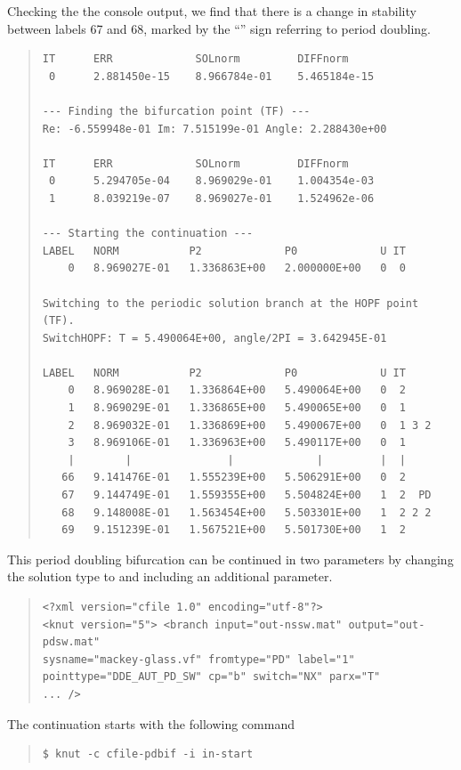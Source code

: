 \documentclass[10pt,a4paper]{ddedoc}
\begin{document}
Checking the the console output, we find that there is a change in
stability between labels 67 and 68, marked by the ``'' sign referring
to period doubling.
{ \small \begin{quote} \begin{lstlisting}[basicstyle=\tt,frame=single]
IT      ERR             SOLnorm         DIFFnorm
 0      2.881450e-15    8.966784e-01    5.465184e-15

--- Finding the bifurcation point (TF) ---
Re: -6.559948e-01 Im: 7.515199e-01 Angle: 2.288430e+00

IT      ERR             SOLnorm         DIFFnorm
 0      5.294705e-04    8.969029e-01    1.004354e-03
 1      8.039219e-07    8.969027e-01    1.524962e-06

--- Starting the continuation ---
LABEL   NORM           P2             P0             U IT
    0   8.969027E-01   1.336863E+00   2.000000E+00   0  0

Switching to the periodic solution branch at the HOPF point (TF).
SwitchHOPF: T = 5.490064E+00, angle/2PI = 3.642945E-01

LABEL   NORM           P2             P0             U IT
    0   8.969028E-01   1.336864E+00   5.490064E+00   0  2
    1   8.969029E-01   1.336865E+00   5.490065E+00   0  1
    2   8.969032E-01   1.336869E+00   5.490067E+00   0  1 3 2
    3   8.969106E-01   1.336963E+00   5.490117E+00   0  1
    |        |               |             |         |  |
   66   9.141476E-01   1.555239E+00   5.506291E+00   0  2
   67   9.144749E-01   1.559355E+00   5.504824E+00   1  2  PD
   68   9.148008E-01   1.563454E+00   5.503301E+00   1  2 2 2
   69   9.151239E-01   1.567521E+00   5.501730E+00   1  2
\end{lstlisting} \end{quote} } \noindent
This period doubling bifurcation can be continued in two parameters 
by changing the solution type to  and including an additional
parameter.
{ \small \begin{quote} \begin{lstlisting}[basicstyle=\tt,frame=single]
<?xml version="cfile 1.0" encoding="utf-8"?>
<knut version="5"> <branch input="out-nssw.mat" output="out-pdsw.mat"
sysname="mackey-glass.vf" fromtype="PD" label="1"
pointtype="DDE_AUT_PD_SW" cp="b" switch="NX" parx="T"
... />
\end{lstlisting} \end{quote} } \noindent
The continuation starts with the following command
{ \small \begin{quote} \begin{lstlisting}[basicstyle=\tt,frame=single]
$ knut -c cfile-pdbif -i in-start
\end{lstlisting} \end{quote} } \noindent
\end{document}
